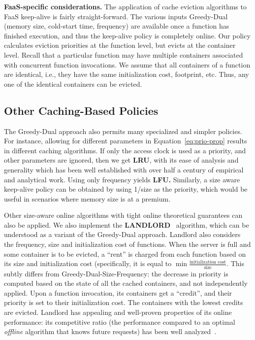 \noindent \textbf{FaaS-specific considerations.}
The application of cache eviction algorithms to FaaS keep-alive is fairly straight-forward.
The various inputs Greedy-Dual (memory size, cold-start time, frequency) are available once a function has finished execution, and thus the keep-alive policy is completely online. 
Our policy calculates eviction priorities at the function level, but evicts at the container level. 
Recall that a particular function may have multiple containers associated with concurrent function invocations. 
We assume that all containers of a function are identical, i.e., they have the same initialization cost, footprint, etc. 
Thus, any one of the identical containers can be evicted. 



\subsection{Other Caching-Based Policies}
\label{subsec:variants}

The Greedy-Dual approach also permits many specialized and simpler policies.
For instance, allowing for different parameters in Equation~\ref{eq:prio-prop} results in different caching algorithms.
If only the access clock is used as a priority, and other parameters are ignored, then we get \textbf{LRU}, with its ease of analysis and generality which has been well established with over half a century of empirical and analytical work. 
Using only frequency yields \textbf{LFU.}
Similarly, a size aware keep-alive policy can be obtained by using 1/size as the priority, which would be useful in scenarios where memory size is at a premium. 


Other size-aware online algorithms with tight online theoretical guarantees can also be applied.
We also implement the \textbf{LANDLORD}~\cite{young2002line} algorithm, which can be understood as a variant of the Greedy-Dual approach.
Landlord also considers the frequency, size and initialization cost of functions.
When the server is full and some container is to be evicted, a ``rent'' is charged from each function based on its size and initialization cost (specifically, it is equal to $\min \frac{\text{initialization cost}}{\text{size}}$.
This subtly differs from Greedy-Dual-Size-Frequency: the decrease in priority is computed based on the state of all the cached containers, and not independently applied. 
Upon a function invocation, its containers get a ``credit'', and their priority is set to their initialization cost. 
The containers with the lowest credits are evicted. 
Landlord has appealing and well-proven properties of its online performance: its competitive ratio (the performance compared to an optimal \emph{offline} algorithm that knows future requests) has been well analyzed~\cite{young2002line}. 




